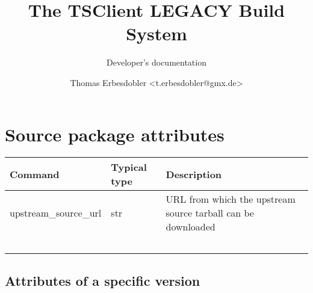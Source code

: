 \documentclass[a4paper]{scrartcl}
\title{The TSClient LEGACY Build System}
\subtitle{Developer's documentation}
\author{Thomas Erbesdobler <t.erbesdobler@gmx.de>}
\begin{document}
	\maketitle
	\tableofcontents
	
	\pagebreak
	
	\section{Source package attributes}
	\label{sec:source_package_attributes}
	
	\begin{tabularx}{\textwidth}{llX}
		Command & Typical type & Description \\
		\hline
		upstream\_source\_url & str & URL from which the upstream source tarball can be downloaded \\\
	\end{tabularx}
	
	\subsection{Attributes of a specific version}
	\label{sec:source_package_version_attributes}
	
\end{document}
